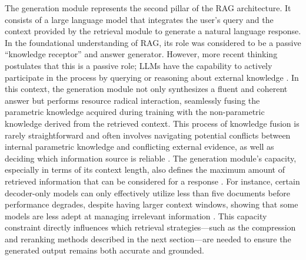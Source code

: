 \documentclass[11pt]{article}
\begin{document}
The generation module represents the second pillar of the RAG architecture. It consists of a large language model that integrates the user's query and the context provided by the retrieval module to generate a natural language response. In the foundational understanding of RAG, its role was considered to be a passive ``knowledge receptor'' and answer generator. However, more recent thinking postulates that this is a passive role; LLMs have the capability to actively participate in the process by querying or reasoning about external knowledge \cite{ref1}. In this context, the generation module not only synthesizes a fluent and coherent answer but performs resource radical interaction, seamlessly fusing the parametric knowledge acquired during training with the non-parametric knowledge derived from the retrieved context. This process of knowledge fusion is rarely straightforward and often involves navigating potential conflicts between internal parametric knowledge and conflicting external evidence, as well as deciding which information source is reliable \cite{ref9}. The generation module's capacity, especially in terms of its context length, also defines the maximum amount of retrieved information that can be considered for a response \cite{ref10}. For instance, certain decoder-only models can only effectively utilize less than five documents before performance degrades, despite having larger context windows, showing that some models are less adept at managing irrelevant information \cite{ref7}. This capacity constraint directly influences which retrieval strategies---such as the compression and reranking methods described in the next section---are needed to ensure the generated output remains both accurate and grounded.
\end{document}
